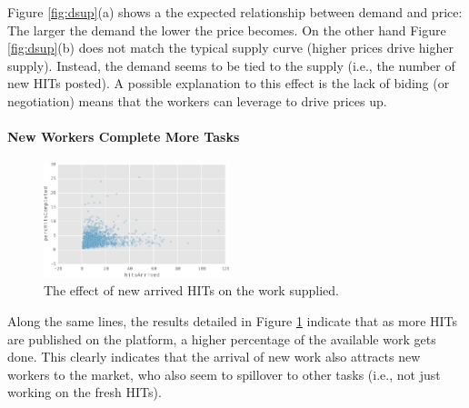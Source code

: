 Figure \ref{fig:dsup}(a) shows a the expected relationship between demand and price: The larger the demand the lower the price becomes. On the other hand Figure \ref{fig:dsup}(b)  does not match the typical supply curve (higher prices drive higher supply). Instead, the demand seems to be tied to  the supply (i.e., the number of new HITs posted). A possible explanation to this effect is the lack of biding (or negotiation) means that the workers can leverage to drive prices up.

\paragraph{New Workers Complete More Tasks}
\begin{figure}[tb]
	\centering
		\includegraphics[width=0.48\textwidth]{figures/percHitsCompleted}
	\caption{The effect of new arrived HITs on the work  supplied.}
	\label{fig:perc_hits_completed}
\end{figure}
Along the same lines, the results detailed in Figure \ref{fig:perc_hits_completed} indicate that as more HITs are published on the platform, a higher percentage of the available work gets done. 
This clearly indicates that the arrival of new work also attracts new workers
to the market, who also seem to spillover to other tasks (i.e., not just working on the fresh HITs).


